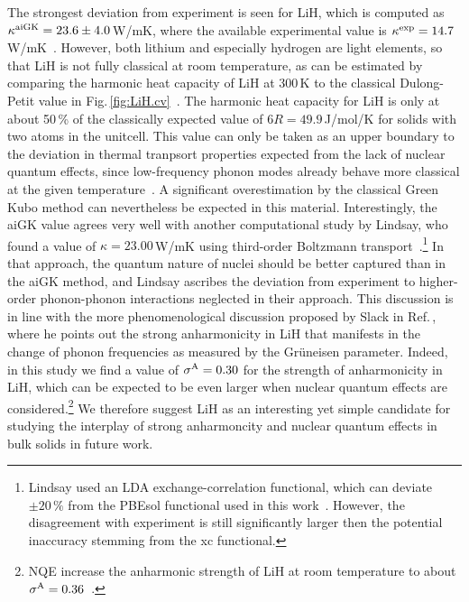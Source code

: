 The strongest deviation from experiment is seen for LiH, which is computed as $\kappa^{\rm aiGK} = 23.6 \pm 4.0$\,W/mK, where the available experimental value is $\kappa^{\rm exp} = 14.7$\,W/mK~\cite{slack1973}. However, both lithium and especially hydrogen are light elements, so that LiH is not fully classical at room temperature, as can be estimated by comparing the harmonic heat capacity of LiH at 300\,K to the classical Dulong-Petit value in Fig.\,\ref{fig:LiH.cv}~\cite{Dove}. The harmonic heat capacity for LiH is only at about 50\,\% of the classically expected value of $6 R = 49.9$\,J/mol/K for solids with two atoms in the unitcell. This value can only be taken as an upper boundary to the deviation in thermal tranpsort properties expected from the lack of nuclear quantum effects, since low-frequency phonon modes already behave more classical at the given temperature~\cite{Volz2020,Volz2020b}.  A significant overestimation by the classical Green Kubo method can nevertheless be expected in this material. Interestingly, the aiGK value agrees very well with another computational study by Lindsay, who found a value of $\kappa = 23.00$\,W/mK using third-order Boltzmann transport~\cite{lindsay2016}.\footnote{Lindsay used an LDA exchange-correlation functional, which can deviate $\pm 20\,\%$ from the PBEsol functional used in this work~\cite{Carbogno2016}. However, the disagreement with experiment is still significantly larger then the potential inaccuracy stemming from the xc functional.} In that approach, the quantum nature of nuclei should be better captured than in the aiGK method, and Lindsay ascribes the deviation from experiment to higher-order phonon-phonon interactions neglected in their approach. This discussion is in line with the more phenomenological discussion proposed by Slack in Ref.\,\cite{slack1973}, where he points out the strong anharmonicity in LiH that manifests in the change of phonon frequencies as measured by the Gr\"uneisen parameter. Indeed, in this study we find a value of $\sigma^\mathrm{A} = 0.30$ for the strength of anharmonicity in LiH, which can be expected to be even larger when nuclear quantum effects are considered.\footnote{NQE increase the anharmonic strength of LiH at room temperature to about $\sigma^\mathrm{A} = 0.36$~\cite{hengst1}.} We therefore suggest LiH as an interesting yet simple candidate for studying the interplay of strong anharmoncity and nuclear quantum effects in bulk solids in future work.


